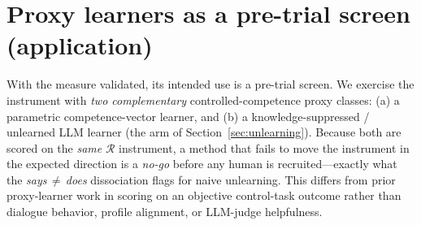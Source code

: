 \documentclass{article}
\newcommand{\regret}{\mathcal{R}}
\begin{document}
\section{Proxy learners as a pre-trial screen (application)}
\label{sec:proxies}
With the measure validated, its intended use is a pre-trial screen. We exercise the instrument with
\emph{two complementary} controlled-competence proxy classes: (a) a parametric competence-vector
learner, and (b) a knowledge-suppressed / unlearned LLM learner (the arm of
Section~\ref{sec:unlearning}). Because both are scored on the \emph{same} $\regret$ instrument, a
method that fails to move the instrument in the expected direction is a \emph{no-go} before any human
is recruited---exactly what the \emph{says\,$\neq$\,does} dissociation flags for naive unlearning. This
differs from prior proxy-learner work
\citep{apartsin2026,ps2_2026,song2026unlearn,llmjudgeaudit2026,educlaw2026} in scoring on an objective
control-task outcome rather than dialogue behavior, profile alignment, or LLM-judge helpfulness.
\end{document}
